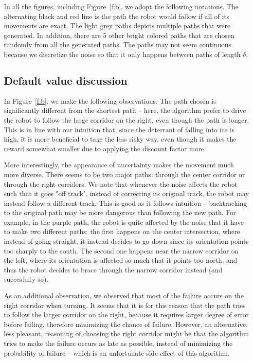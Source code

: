 \documentclass[a4paper]{article}
\begin{document}
In all the figures, including Figure~\ref{f:b}, we adopt the following notations.
The alternating black and red line is the path the robot would follow if
all of its movements are exact. The light grey paths depicts multiple paths
that were generated. In addition, there are 5 other bright colored paths that
are chosen randomly from all the generated paths. The paths may not seem continuous
because we discretize the noise so that it only happens between paths of length
$\delta$.

\subsection{Default value discussion}
In Figure~\ref{f:b}, we make the following observations. The path chosen is
significantly different from the shortest path -- here, the algorithm prefer
to drive the robot to follow the large corridor on the right, even though
the path is longer. This is in line with our intuition that, since the deterrant
of falling into ice is high, it is more beneficial to take the less risky way,
even though it makes the reward somewhat smaller due to applying the discount
factor more.

More interestingly, the appearance of uncertainty makes the movement much more
diverse. There seems to be two major paths: through the center corridor or
through the right corridors. We note that whenever the noise affects the robot
such that it goes "off track", instead of correcting its original track, the
robot may instead follow a different track. This is good as it follows
intuition -- backtracking to the original path may be more dangerous
than following the new path. For example, in the purple path, the robot is
quite affected by the noise that it have to make two different paths: the first
happens on the center intersection, where instead of going straight, it instead
decides to go down since its orientation points too sharply to the south. The
second one happens near the narrow corridor on the left, where its orientation
is affected so much that it points too north, and thus the robot decides to
brace through the narrow corridor instead (and succesfully so).

As an additional observation, we observed that most of the failure occurs on the
right corridor when turning. It seems that it is for this reason that the path
tries to follow the larger corridor on the right, because it requires larger degree
of error before failing, therefore minimizing the chance of failure. However,
an alternative, less pleasant, reasoning of choosing the right corridor might
be that the algorithm tries to make the failure occurs as late as possible,
instead of minimizing the probability of failure -- which is an unfortunate side
effect of this algorithm.
\end{document}

